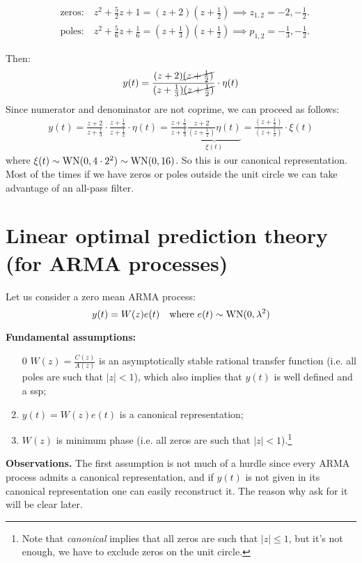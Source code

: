 \begin{align*}
	&\text{zeros:}\quad z^2+\frac{5}{2}z+1=(z+2)(z+\frac{1}{2}) \implies z_{1,2}=-2,-\frac{1}{2}.\\
	&\text{poles:}\quad z^2+\frac{5}{6}z+\frac{1}{6}=(z+\frac{1}{3})(z+\frac{1}{2}) \implies p_{1,2}=-\frac{1}{3},-\frac{1}{2}.
\end{align*}

Then:
\begin{align*}
	y(t)=\frac{(z+2)\cancel{(z+\frac{1}{2})}}{(z+\frac{1}{3})\cancel{(z+\frac{1}{2})}}\cdot \eta(t) 
\end{align*}
Since numerator and denominator are not coprime, we can proceed as follows:
\begin{align*}
	y(t)=\frac{z+2}{z+\frac{1}{3}}\cdot\frac{z+\frac{1}{2} }{z+\frac{1}{2}}\cdot\eta(t)=\frac{z+\frac{1}{2}}{z+\frac{1}{3}}\underbrace{\frac{z+2}{(z+\frac{1}{2})}\eta(t)}_{\xi(t)}=\frac{(z+\frac{1}{2})}{(z+\frac{1}{3})}\cdot \xi(t)
\end{align*}
where $\xi(t)\sim \operatorname{WN}(0,4\cdot2^2)\sim \operatorname{WN}(0,16)$. So this is our canonical representation. Most of the times if we have zeros or poles outside the unit circle we can take advantage of an all-pass filter.

\section{Linear optimal prediction theory (for ARMA processes)}
Let us consider a zero mean ARMA process:
\[
	y(t)=W(z)e(t) \quad \text{where }e(t)\sim \operatorname{WN}(0,\lambda^{2} )
\]

\textbf{Fundamental assumptions:}\label{assumptions-prediction-theory}
\begin{enumerate}
	\item[0] $W(z)=\frac{C(z)}{A(z)}$ is an asymptotically stable rational transfer function (i.e. all poles are such that $|z|<1$), which also implies that $y(t)$ is well defined and a \gls{ssp};
	\item $y(t) = W(z)e(t)$ is a canonical representation;
	\item $W(z)$ is minimum phase (i.e. all zeros are such that $|z|<1$).\footnote{Note that \emph{canonical} implies that all zeros are such that $|z|\le 1$, but it's not enough, we have to exclude zeros on the unit circle.}
\end{enumerate}
 
\textbf{Observations.}
The first assumption is not much of a hurdle since every ARMA process admits a canonical representation, and if $y(t)$ is not given in its canonical representation one can easily reconstruct it. The reason why ask for it will be clear later. 


